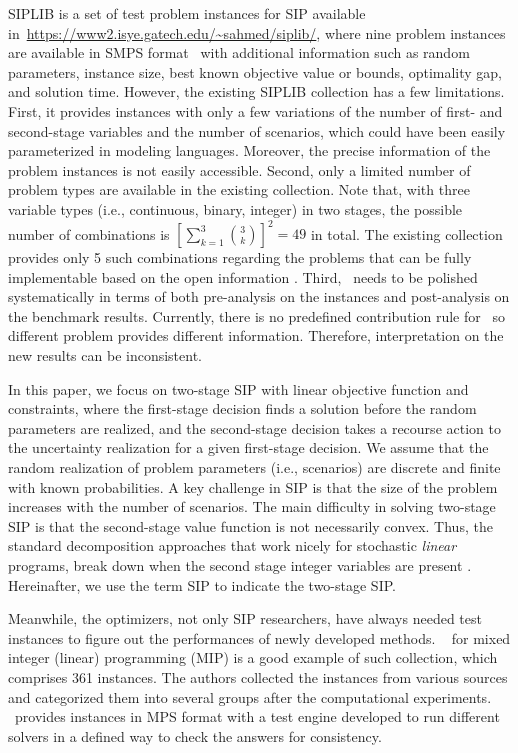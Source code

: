 SIPLIB is a set of test problem instances for SIP available in~\url{https://www2.isye.gatech.edu/~sahmed/siplib/}, where nine problem instances are available in SMPS format~\cite{?} with additional information such as random parameters, 
instance size, best known objective value or bounds, optimality gap, and solution time.  
However, the existing SIPLIB collection has a few limitations. 
First, it provides instances with only a few variations of the number of first- and second-stage variables and the number of scenarios, which could have been easily parameterized in 
modeling languages. Moreover, the precise information of the problem instances is 
not easily accessible. Second, only a limited number of problem types are available in 
the existing collection. Note that, with three variable types (i.e., continuous, 
binary, integer) in two stages, the possible number of combinations is $\left[\sum_{k=1}
^3\binom{3}{k}\right]^2=49$ in total. 
The existing collection provides only 5 such combinations 
regarding the problems that can be fully implementable based on the open information .
Third, \siplib\ needs to be polished systematically in terms of both pre-analysis on the 
instances and post-analysis on the benchmark results. Currently, there is no predefined 
contribution rule for \siplib\ so different problem provides different information. 
Therefore, interpretation on the new results can be inconsistent.

In this paper, we focus on two-stage SIP with 
linear objective function and constraints, where the first-stage decision finds a solution before the 
random parameters are realized, and the second-stage decision takes a recourse action to the 
uncertainty realization for a given first-stage decision. We assume that the random realization of problem parameters (i.e., scenarios) are discrete and finite with known probabilities.
A key challenge in SIP is that the size of
the problem increases with the number of scenarios. The main difficulty in solving two-stage SIP is that the 
second-stage value function is not necessarily convex. Thus, the standard decomposition 
approaches that work nicely for stochastic \textit{linear} programs, break down when the 
second stage integer variables are present \cite{journal:AG2004}. Hereinafter, we use the 
term SIP to indicate the two-stage SIP. 


Meanwhile, the optimizers, not only SIP researchers, have always needed test instances to 
figure out the performances of newly developed methods. \miplib\ \cite{MIPLIB} for mixed 
integer (linear) programming (MIP) is a good example of such collection, which comprises 361 
instances. The authors collected the instances from various sources and categorized them into 
several groups after the computational experiments. \miplib\ provides instances in 
\textsf{MPS} format with a test engine developed to run different solvers in a defined way to 
check the answers for consistency. 



